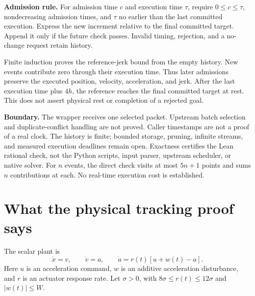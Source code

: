 \documentclass[11pt,letterpaper]{article}
\begin{document}
\textbf{Admission rule.} For admission time $c$ and execution time $\tau$, require $0\leq c\leq\tau$, nondecreasing admission times, and $\tau$ no earlier than the last committed execution. Express the new increment relative to the final committed target. Append it only if the future check passes. Invalid timing, rejection, and a no-change request retain history.

Finite induction proves the reference-jerk bound from the empty history. New events contribute zero through their execution time. Thus later admissions preserve the executed position, velocity, acceleration, and jerk. After the last execution time plus $4h$, the reference reaches the final committed target at rest. This does not assert physical rest or completion of a rejected goal.

\textbf{Boundary.} The wrapper receives one selected packet. Upstream batch selection and duplicate-conflict handling are not proved. Caller timestamps are not a proof of a real clock. The history is finite; bounded storage, pruning, infinite streams, and measured execution deadlines remain open. Exactness certifies the Lean rational check, not the Python scripts, input parser, upstream scheduler, or native solver. For $n$ events, the direct check visits at most $5n+1$ points and sums $n$ contributions at each. No real-time execution cost is established.

\newpage
\section{What the physical tracking proof says}
The scalar plant is
\begin{equation}\label{plant}
\dot x=v,\qquad \dot v=a,\qquad \dot a=r(t)[u+w(t)-a].
\end{equation}
Here $u$ is an acceleration command, $w$ is an additive acceleration disturbance, and $r$ is an actuator response rate. Let $\sigma>0$, with $8\sigma\leq r(t)\leq12\sigma$ and $|w(t)|\leq W$.
\end{document}
